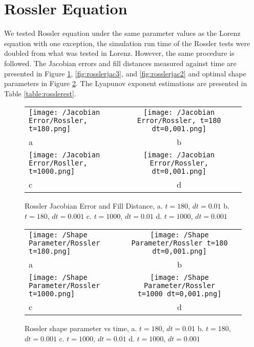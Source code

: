         \section{Rossler Equation}

                We tested Rossler equation under the same parameter values as the Lorenz equation with one exception,
                the simulation run time of the Rossler tests were doubled from what was tested in Lorenz. However, the same procedure
                is followed.
                The Jacobian errors
                and fill distances measured against time are presented in Figure \ref{fig:rosslerjac}, \ref{fig:rosslerjac3}, and \ref{fig:rosslerjac2} and optimal shape parameters
                in Figure \ref{fig:rosslershape}. The Lyapunov
                exponent estimations are presented in Table \ref{table:rosslerest}.\\
            \begin{figure}[H]
                \centering
                \begin{tabular}{lcc}
                    \texttt{[image: /Jacobian Error/Rossler, t=180.png]}&
                    \texttt{[image: /Jacobian Error/Rossler, t=180 dt=0,001.png]}\\
                    \hfil a &b\\
                    \texttt{[image: /Jacobian Error/Rosller, t=1000.png]}&
                    \texttt{[image: /Jacobian Error/Rossler, dt=0,001.png]}\\
                    \hfil c &d\\
                \end{tabular}
                \caption{Rossler Jacobian Error and Fill Distance, a. $t=180$, $dt=0.01$ b. $t=180$, $dt=0.001$ c. $t=1000$, $dt=0.01$ d. $t=1000$, $dt=0.001$}\label{fig:rosslerjac}
            \end{figure}
            \begin{figure}[H]
                \centering
                \begin{tabular}{lcc}
                    \texttt{[image: /Shape Parameter/Rossler t=180.png]}&
                    \texttt{[image: /Shape Parameter/Rossler t=180 dt=0,001.png]}\\
                    \hfil a &b\\
                    \texttt{[image: /Shape Parameter/Rossler t=1000.png]}&
                    \texttt{[image: /Shape Parameter/Rossler t=1000 dt=0,001.png]}\\
                    \hfil c &d\\
                \end{tabular}
                \caption{Rossler shape parameter vs time, a. $t=180$, $dt=0.01$ b. $t=180$, $dt=0.001$ c. $t=1000$, $dt=0.01$ d. $t=1000$, $dt=0.001$}\label{fig:rosslershape}
            \end{figure}
